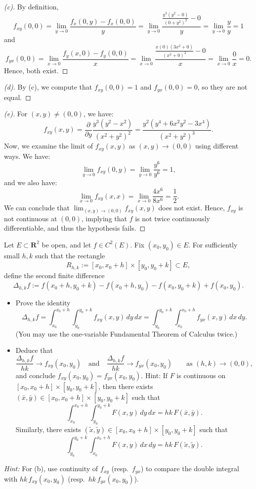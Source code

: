 \begin{proof}[(c)]
    By definition, 
    \[
    f_{xy}(0,0) = \lim_{y \to 0} \frac{f_x(0,y) - f_x(0,0)}{y} = \lim_{y \to 0} \frac{\frac{y^3(y^2-0)}{(0+y^2)^2} - 0}{y} = \lim_{y \to 0} \frac{y}{y} = 1
    \]
    and
    \[
    f_{yx}(0,0) = \lim_{x \to 0} \frac{f_y(x,0) - f_y(0,0)}{x} = \lim_{x \to 0} \frac{\frac{x(0)(3x^2+0)}{(x^2+0)^2} - 0}{x} = \lim_{x \to 0} \frac{0}{x} = 0.
    \]
    Hence, both exist.
\end{proof}

\begin{proof}[(d)]
    By (c), we compute that $f_{xy}(0,0)=1$ and $f_{yx}(0,0)=0$, so they are not equal.
\end{proof}

\begin{proof}[(e)]
    For $(x,y) \neq (0,0)$, we have:
    \[
    f_{xy}(x,y) = \frac{\partial}{\partial y} \frac{y^3(y^2-x^2)}{(x^2+y^2)^2} = \frac{y^2(y^4+6x^2y^2-3x^4)}{(x^2+y^2)^3}.
    \]
    Now, we examine the limit of $f_{xy}(x,y)$ as $(x,y) \to (0,0)$ using different ways. We have:
    \[
    \lim_{y \to 0} f_{xy}(0,y) = \lim_{y \to 0} \frac{y^6}{y^6} = 1, 
    \]
    and we also have:
    \[
    \lim_{x \to 0} f_{xy}(x,x) = \lim_{x \to 0} \frac{4x^6}{8x^6} = \frac{1}{2}.
    \]
    We can conclude that $\lim_{(x,y) \to (0,0)}f_{xy}(x, y)$ does not exist. Hence, $f_{xy}$ is not continuous at $(0,0)$, implying that $f$ is not twice continuously differentiable, and thus the hypothesis fails.
\end{proof}

\begin{problem}
    Let $E\subset\mathbf{R}^2$ be open, and let $f\in C^2(E)$.
Fix $(x_0,y_0)\in E$.  For sufficiently small $h,k$ such that the rectangle
\[
R_{h,k}:=[x_0,x_0+h]\times [y_0,y_0+k]\subset E,
\]
define the second finite difference
\[
\Delta_{h,k} f
:=
f(x_0+h,y_0+k)-f(x_0+h,y_0)-f(x_0,y_0+k)+f(x_0,y_0).
\]
\begin{itemize}
\item[(a)] Prove the identity
\[
\Delta_{h,k} f
=
\int_{x_0}^{x_0+h}\int_{y_0}^{y_0+k} f_{xy}(x,y)\,dy\,dx
=
\int_{y_0}^{y_0+k}\int_{x_0}^{x_0+h} f_{yx}(x,y)\,dx\,dy.
\]
(You may use the one-variable Fundamental Theorem of Calculus twice.)
\item[(b)] Deduce that
\[
\frac{\Delta_{h,k} f}{hk}\to f_{xy}(x_0,y_0)
\quad\text{and}\quad
\frac{\Delta_{h,k} f}{hk}\to f_{yx}(x_0,y_0)
\qquad\text{as }(h,k)\to(0,0),
\]
and conclude $f_{xy}(x_0,y_0)=f_{yx}(x_0,y_0)$. Hint:  If $F$ is continuous on $[x_0,x_0+h]\times [y_0,y_0+k]$, then there exists
$(\bar x,\bar y)\in [x_0,x_0+h]\times [y_0,y_0+k]$ such that
\[
\int_{x_0}^{x_0+h}\int_{y_0}^{y_0+k} F(x,y)\,dy\,dx
= hk\,F(\bar x,\bar y).
\]
Similarly, there exists $(\tilde x,\tilde y)\in [x_0,x_0+h]\times [y_0,y_0+k]$ such that
\[
\int_{y_0}^{y_0+k}\int_{x_0}^{x_0+h} F(x,y)\,dx\,dy
= hk\,F(\tilde x,\tilde y).
\]

\end{itemize}

\medskip
\noindent\emph{Hint:} For (b), use continuity of $f_{xy}$ (resp.\ $f_{yx}$) to compare the double integral with $hk\,f_{xy}(x_0,y_0)$ (resp.\ $hk\,f_{yx}(x_0,y_0)$).
\end{problem}

